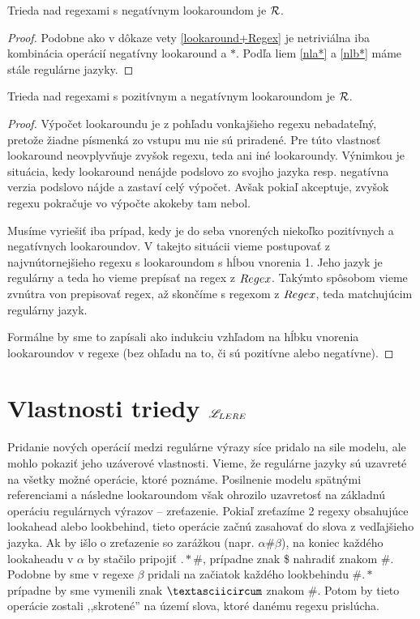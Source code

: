 \begin{veta}\label{nlookaround+R}
Trieda nad regexami s negatívnym lookaroundom je ${\cal R}$.
\end{veta}
\begin{proof}
Podobne ako v dôkaze vety \ref{lookaround+Regex} je netriviálna iba kombinácia operácií negatívny lookaround a $*$. Podľa liem \ref{nla*} a \ref{nlb*} máme stále regulárne jazyky.
\end{proof}

\begin{dosledok}
Trieda nad regexami s pozitívnym a negatívnym lookaroundom je ${\cal R}$.
\end{dosledok}
\begin{proof}
Výpočet lookaroundu je z pohľadu vonkajšieho regexu nebadateľný, pretože žiadne písmenká zo vstupu mu nie sú priradené. Pre túto vlastnosť lookaround ne\-ov\-plyv\-ňu\-je zvyšok regexu, teda ani iné lookaroundy. Výnimkou je situácia, kedy look\-around nenájde podslovo zo svojho jazyka resp. negatívna verzia podslovo nájde a zastaví celý výpočet. Avšak pokiaľ akceptuje, zvyšok regexu pokračuje vo výpočte akokeby tam nebol.

Musíme vyriešiť iba prípad, kedy je do seba vnorených niekoľko pozitívnych a negatívnych lookaroundov. V takejto situácii vieme postupovať z najvnútornejšieho regexu s lookaroundom s hĺbou vnorenia 1. Jeho jazyk je regulárny a teda ho vieme prepísať na regex z $Regex$. Takýmto spôsobom vieme zvnútra von prepisovať regex, až skončíme s regexom z $Regex$, teda matchujúcim regulárny jazyk.

Formálne by sme to zapísali ako indukciu vzhľadom na hĺbku vnorenia lookaroundov v regexe (bez ohľadu na to, či sú pozitívne alebo negatívne).
\end{proof}

\section{Vlastnosti triedy $\mathscr{L}_{LERE}$}

Pridanie nových operácií medzi regulárne výrazy síce pridalo na sile modelu, ale mohlo pokaziť jeho uzáverové vlastnosti. Vieme, že regulárne jazyky sú uzavreté na všetky možné operácie, ktoré poznáme. Posilnenie modelu spätnými referenciami a následne lookaroundom však ohrozilo uzavretosť na základnú operáciu regulárnych výrazov -- zreťazenie. Pokiaľ zreťazíme 2 regexy obsahujúce lookahead alebo lookbehind, tieto operácie začnú zasahovať do slova z vedľajšieho jazyka. Ak by išlo o zreťazenie so zarážkou (napr. $\alpha\#\beta$), na koniec každého lookaheadu v $\alpha$ by stačilo pripojiť $.*\#$, prípadne znak \$ nahradiť znakom \#. Podobne by sme v regexe $\beta$ pridali na začiatok každého lookbehindu $\#.*$ prípadne by sme vymenili znak $\textasciicircum$  znakom \#. Potom by tieto operácie zostali ,,skrotené'' na území slova, ktoré danému regexu prislúcha.

